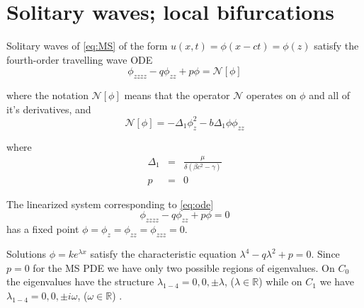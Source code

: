 \section{Solitary waves; local bifurcations}

Solitary waves of \eqref{eq:MS} of the form 
$u(x,t) = \phi\left(x - c t\right) = \phi\left(z\right)$
 satisfy the fourth-order travelling wave ODE
\begin{equation} \label{eq:ode} \phi_{zzzz} - q \phi_{zz} + p \phi = \mathcal{N}[\phi]
\end{equation}

where the notation $\mathcal{N[\phi]}$ means that the operator $\mathcal{N}$ operates on $\phi$ and all of it's derivatives, and 
\begin{equation}
\mathcal{N}\left[\phi\right] = -\Delta_1 \phi_z^2 - b \Delta_1 \phi \phi_{zz}
\end{equation}

where 
\begin{subequations}
\begin{eqnarray}
\Delta_1 &=& \frac{\mu}{ \delta\left( \beta c^2 - \gamma\right) } \\
p &=& 0 
\end{eqnarray}
\end{subequations}

The linearized system corresponding to \eqref{eq:ode}
\begin{equation}
 \label{eq:ode} \phi_{zzzz} - q \phi_{zz} + p \phi = 0
\end{equation}
has a fixed point $\phi = \phi_z = \phi_{zz} = \phi_{zzz} = 0 $.

Solutions $\phi = k e^{\lambda x}$ satisfy the characteristic equation
$\lambda^4 - q \lambda^2 + p = 0 $. Since $p=0$ for the MS PDE we have only two
possible regions of eigenvalues. On $C_0$ the eigenvalues have the structure
$\lambda_{1-4} = 0,0,\pm \lambda$, ($\lambda \in \mathbb{R}$) while on $C_1$ we
have $\lambda_{1-4} = 0,0,\pm i \omega $, ($\omega \in \mathbb{R} $) .

